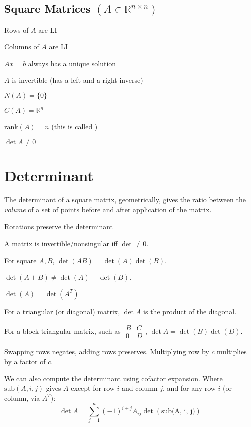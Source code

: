 \documentclass[10pt]{extarticle}
\newcommand{\R}{\mathbb{R}}
\begin{document}
\begin{multicols*}{2}
\subsection{Square Matrices $(A \in \R^{n\times n})$}
\begin{compactenum}
\item Rows of $A$ are LI
\item Columns of $A$ are LI
\item $Ax=b$ always has a unique solution
\item $A$ is invertible (has a left and a right inverse)
\item $N(A) = \{0\}$
\item $C(A) = \R^n$
\item $\text{rank}(A) = n$ (this is called )
\item $\det A \neq 0$
\end{compactenum}

\section{Determinant}
The determinant of a square matrix, geometrically, gives the ratio between the \emph{volume} of a set of points before and after application of the matrix.
\begin{compactitem}
	\item Rotations preserve the determinant
	\item A matrix is invertible/nonsingular iff $\det \neq 0$.
	\item For square $A, B$, $\det(AB) = \det(A) \det(B)$.
	\item $\det(A+B) \neq \det(A) + \det(B)$.
	\item $\det(A) = \det (A^T)$
	\item For a triangular (or diagonal) matrix, $\det A$ is the product of the diagonal.
	\item For a block triangular matrix, such as $\begin{smallmatrix}B & C \\ 0 & D\end{smallmatrix}$, $\det A = \det(B) \det(D)$.
	\item Swapping rows negates, adding rows preserves. Multiplying row by $c$ multiplies by a factor of $c$.
\end{compactitem}

We can also compute the determinant using cofactor expansion. Where $\text{sub}(A, i, j)$ gives $A$ except for row $i$ and column $j$, and for any row $i$ (or column, via $A^T$):
\[ \det A = \sum_{j=1}^n (-1)^{i + j} A_{ij} \det(\text{sub(A, i, j)}) \]


\end{multicols*}
\end{document}
